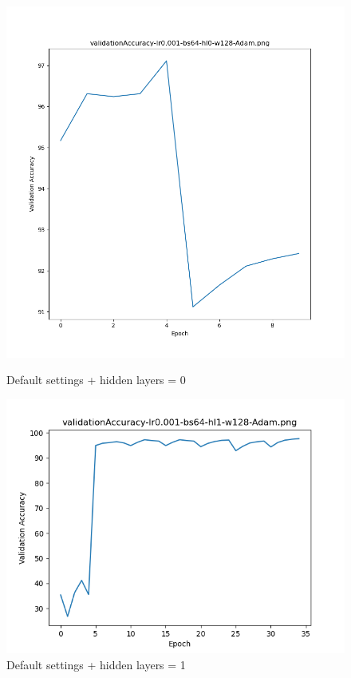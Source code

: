 \documentclass{article}[12pt]
\begin{document}
    \begin{figure}[H]
        \includegraphics[width=\linewidth]{testsResults/validationAccuracy/validationAccuracyhl0.png}
        \caption{Default settings + hidden layers = 0}
        \endminipage\hfill
        \includegraphics[width=\linewidth]{testsResults/validationAccuracy/validationAccuracy-lr0.001-bs64-hl1-w128-Adam.png}
        \caption{Default settings + hidden layers = 1}
        \endminipage
    \end{figure}
\end{document}
